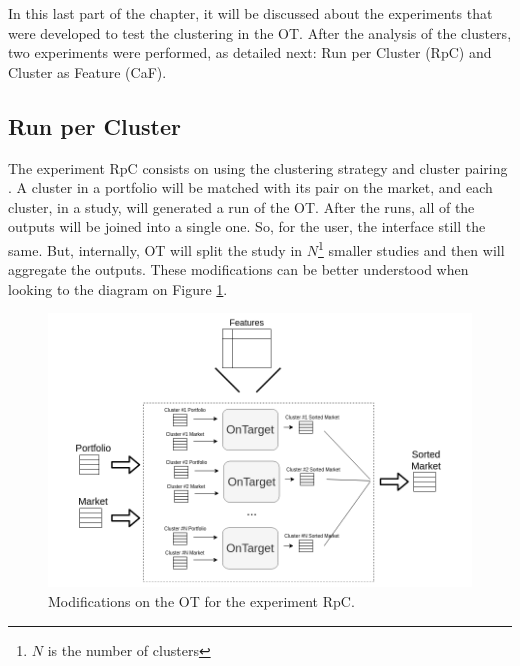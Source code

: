 \newcommand{\fullNameExperimentI}{Run per Cluster}
\newcommand{\nameExperimentI}{RpC}
\newcommand{\fullNameExperimentII}{Cluster as Feature}
\newcommand{\nameExperimentII}{CaF}


In this last part of the chapter, it will be discussed about the experiments that were developed to test the clustering in the OT. After the analysis of the clusters, two experiments were performed, as detailed next: \fullNameExperimentI{} (\nameExperimentI{}) and \fullNameExperimentII{} (\nameExperimentII{}).

\subsection{\fullNameExperimentI{}}
\label{ch:experiment-i}

The experiment \nameExperimentI{} consists on using the clustering strategy \nameClusterStrategyA{} and cluster pairing \nameClusterPairingA{}. A cluster in a portfolio will be matched with its pair on the market, and each cluster, in a study, will generated a run of the OT. After the runs, all of the outputs will be joined into a single one. So, for the user, the interface still the same. But, internally, OT will split the study in $N$\footnote{$N$ is the number of clusters} smaller studies and then will aggregate the outputs. These modifications can be better understood when looking to the diagram on Figure \ref{fig:one-run-each-cluster}. 

\begin{figure}[h]
   \centering
   \includegraphics[width=\linewidth]{fig/ch3-one-run-each-cluster.png}
   \caption{Modifications on the OT for the experiment \nameExperimentI{}.}
   \label{fig:one-run-each-cluster}
\end{figure}

